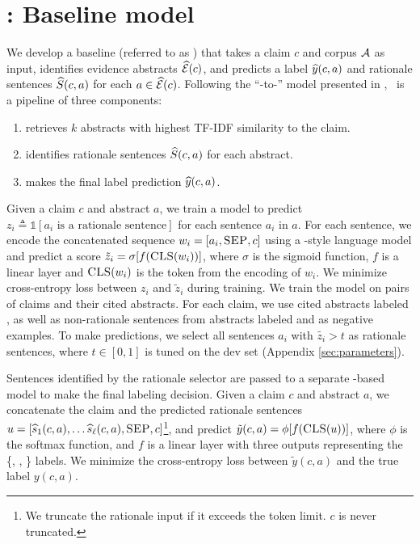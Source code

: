 \section{\sysname: Baseline model} \label{sec:baselines}
We develop a baseline (referred to as \sysname) that takes a claim $c$ and corpus ${\mathcal{A}}$ as input, identifies evidence abstracts $\widehat{{\mathcal{E}}}(c)$, and predicts a label $\widehat{y}(c,a)$ and rationale sentences $\widehat{S}(c, a)$ for each $a \in \widehat{{\mathcal{E}}}(c)$.  Following the ``\bert-to-\bert''  model presented in \citet{DeYoung2019ERASERAB,Soleimani2019BERTFE}, \sysname\ is a pipeline of three components:

\begin{enumerate}[leftmargin=*]
    \item \componentone retrieves $k$ abstracts with highest TF-IDF similarity to the claim.
    \item \componenttwo identifies rationale sentences $\widehat{S}(c, a)$ for each abstract.
    \item \componentthree makes the final label prediction $\widehat{y}(c, a)$.
\end{enumerate}


\vspace{.2cm}  \label{sec:rationale_selection}
Given a claim $c$ and abstract $a$, we train a model to predict $z_i \triangleq \mathds{1}[a_i \textrm{ is a rationale sentence}]$ for each sentence $a_i$ in $a$. For each sentence, we encode the concatenated sequence $w_i = [a_i, \textsc{SEP}, c]$ using a \bert-style language model and predict a score $\tilde{z}_i = \sigma[f(\textsc{CLS}(w_i))]$, where $\sigma$ is the sigmoid function, $f$ is a linear layer and $\textsc{CLS}(w_i)$ is the \cls token from the encoding of $w_i$. We minimize cross-entropy loss between $z_i$ and $\tilde{z}_i$ during training. We train the model on pairs of claims and their cited abstracts. For each claim, we use cited abstracts labeled \notenough, as well as non-rationale sentences from abstracts labeled \supports and  as negative examples. To make predictions, we select all sentences $a_i$ with $\tilde{z_i} > t$ as rationale sentences, where $t \in [0, 1]$ is tuned on the dev set (Appendix \ref{sec:parameters}).



\vspace{.2cm}  \label{sec:entailment}
Sentences identified by the rationale selector are passed to a separate \bert-based model to make the final
labeling decision. Given a claim $c$ and abstract $a$, we concatenate the claim and the predicted rationale sentences $u = [\widehat{s}_1(c, a), \dots \widehat{s}_{\ell}(c, a), \textsc{SEP}, c]$\footnote{We truncate the rationale input if it exceeds the \bert token limit. $c$ is never truncated.}, and predict $\tilde{y}(c, a) = \phi[f(\textsc{CLS}(u))]$, where $\phi$ is the softmax function, and $f$ is a linear layer with three outputs representing the \{\supports, , \notenough\} labels. We minimize the cross-entropy loss between $\tilde{y}(c, a)$ and the true label $y(c, a)$.

